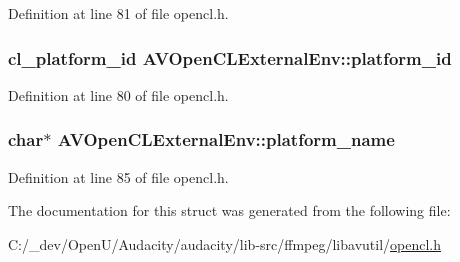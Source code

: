 Definition at line 81 of file opencl.\+h.

\subsubsection[{\texorpdfstring{platform\+\_\+id}{platform_id}}]{\setlength{\rightskip}{0pt plus 5cm}cl\+\_\+platform\+\_\+id A\+V\+Open\+C\+L\+External\+Env\+::platform\+\_\+id}\hypertarget{struct_a_v_open_c_l_external_env_a6a1ac4ebac445a206454a48fc47cf58c}{}\label{struct_a_v_open_c_l_external_env_a6a1ac4ebac445a206454a48fc47cf58c}


Definition at line 80 of file opencl.\+h.

\subsubsection[{\texorpdfstring{platform\+\_\+name}{platform_name}}]{\setlength{\rightskip}{0pt plus 5cm}char$\ast$ A\+V\+Open\+C\+L\+External\+Env\+::platform\+\_\+name}\hypertarget{struct_a_v_open_c_l_external_env_a9b9eb739554b516ca3a6e924f8415a73}{}\label{struct_a_v_open_c_l_external_env_a9b9eb739554b516ca3a6e924f8415a73}


Definition at line 85 of file opencl.\+h.



The documentation for this struct was generated from the following file\+:\begin{DoxyCompactItemize}
\item 
C\+:/\+\_\+dev/\+Open\+U/\+Audacity/audacity/lib-\/src/ffmpeg/libavutil/\hyperlink{opencl_8h}{opencl.\+h}\end{DoxyCompactItemize}
